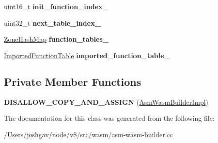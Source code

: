\begin{DoxyCompactItemize}
\item 
uint16\+\_\+t {\bfseries init\+\_\+function\+\_\+index\+\_\+}\hypertarget{classv8_1_1internal_1_1wasm_1_1_asm_wasm_builder_impl_a38f6c069615599163d0047851e831132}{}\label{classv8_1_1internal_1_1wasm_1_1_asm_wasm_builder_impl_a38f6c069615599163d0047851e831132}

\item 
uint32\+\_\+t {\bfseries next\+\_\+table\+\_\+index\+\_\+}\hypertarget{classv8_1_1internal_1_1wasm_1_1_asm_wasm_builder_impl_a8206f5e3362ebfcabe00014e3b1fb959}{}\label{classv8_1_1internal_1_1wasm_1_1_asm_wasm_builder_impl_a8206f5e3362ebfcabe00014e3b1fb959}

\item 
\hyperlink{classv8_1_1internal_1_1_template_hash_map_impl}{Zone\+Hash\+Map} {\bfseries function\+\_\+tables\+\_\+}\hypertarget{classv8_1_1internal_1_1wasm_1_1_asm_wasm_builder_impl_a8fc1c7535c001e44ccc4b613ee435e30}{}\label{classv8_1_1internal_1_1wasm_1_1_asm_wasm_builder_impl_a8fc1c7535c001e44ccc4b613ee435e30}

\item 
\hyperlink{classv8_1_1internal_1_1wasm_1_1_asm_wasm_builder_impl_1_1_imported_function_table}{Imported\+Function\+Table} {\bfseries imported\+\_\+function\+\_\+table\+\_\+}\hypertarget{classv8_1_1internal_1_1wasm_1_1_asm_wasm_builder_impl_a323b285c4a649f29c99725d90cced3c5}{}\label{classv8_1_1internal_1_1wasm_1_1_asm_wasm_builder_impl_a323b285c4a649f29c99725d90cced3c5}

\end{DoxyCompactItemize}
\subsection*{Private Member Functions}
\begin{DoxyCompactItemize}
\item 
{\bfseries D\+I\+S\+A\+L\+L\+O\+W\+\_\+\+C\+O\+P\+Y\+\_\+\+A\+N\+D\+\_\+\+A\+S\+S\+I\+GN} (\hyperlink{classv8_1_1internal_1_1wasm_1_1_asm_wasm_builder_impl}{Asm\+Wasm\+Builder\+Impl})\hypertarget{classv8_1_1internal_1_1wasm_1_1_asm_wasm_builder_impl_a72aab449a9518904dedaa5c2c9b0c176}{}\label{classv8_1_1internal_1_1wasm_1_1_asm_wasm_builder_impl_a72aab449a9518904dedaa5c2c9b0c176}

\end{DoxyCompactItemize}


The documentation for this class was generated from the following file\+:\begin{DoxyCompactItemize}
\item 
/\+Users/joshgav/node/v8/src/wasm/asm-\/wasm-\/builder.\+cc\end{DoxyCompactItemize}
